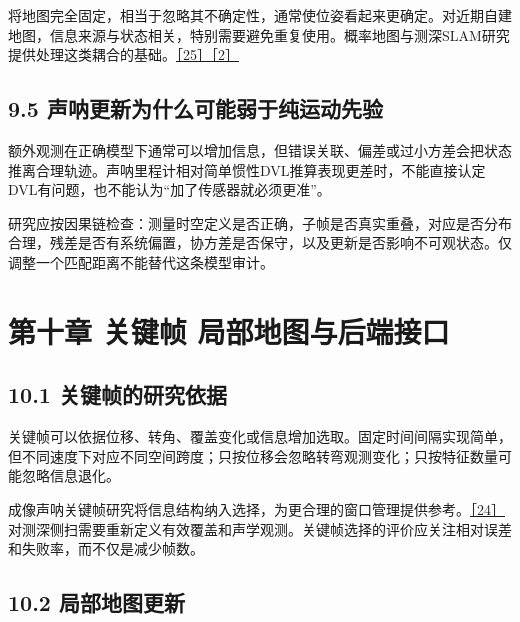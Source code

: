 将地图完全固定，相当于忽略其不确定性，通常使位姿看起来更确定。对近期自建地图，信息来源与状态相关，特别需要避免重复使用。概率地图与测深SLAM研究提供处理这类耦合的基础。\href{https://arxiv.org/abs/2203.10893}{［25］}\href{https://doi.org/10.1177/0278364912459666}{［2］}

\hypertarget{ux58f0ux5450ux66f4ux65b0ux4e3aux4ec0ux4e48ux53efux80fdux5f31ux4e8eux7eafux8fd0ux52a8ux5148ux9a8c}{%
\subsection{9.5 声呐更新为什么可能弱于纯运动先验}\label{ux58f0ux5450ux66f4ux65b0ux4e3aux4ec0ux4e48ux53efux80fdux5f31ux4e8eux7eafux8fd0ux52a8ux5148ux9a8c}}

额外观测在正确模型下通常可以增加信息，但错误关联、偏差或过小方差会把状态推离合理轨迹。声呐里程计相对简单惯性DVL推算表现更差时，不能直接认定DVL有问题，也不能认为``加了传感器就必须更准''。

研究应按因果链检查：测量时空定义是否正确，子帧是否真实重叠，对应是否分布合理，残差是否有系统偏置，协方差是否保守，以及更新是否影响不可观状态。仅调整一个匹配距离不能替代这条模型审计。

\hypertarget{ux7b2cux5341ux7ae0-ux5173ux952eux5e27-ux5c40ux90e8ux5730ux56feux4e0eux540eux7aefux63a5ux53e3}{%
\section{第十章 关键帧 局部地图与后端接口}\label{ux7b2cux5341ux7ae0-ux5173ux952eux5e27-ux5c40ux90e8ux5730ux56feux4e0eux540eux7aefux63a5ux53e3}}

\hypertarget{ux5173ux952eux5e27ux7684ux7814ux7a76ux4f9dux636e}{%
\subsection{10.1 关键帧的研究依据}\label{ux5173ux952eux5e27ux7684ux7814ux7a76ux4f9dux636e}}

关键帧可以依据位移、转角、覆盖变化或信息增加选取。固定时间间隔实现简单，但不同速度下对应不同空间跨度；只按位移会忽略转弯观测变化；只按特征数量可能忽略信息退化。

成像声呐关键帧研究将信息结构纳入选择，为更合理的窗口管理提供参考。\href{https://arxiv.org/abs/2106.16032}{［24］} 对测深侧扫需要重新定义有效覆盖和声学观测。关键帧选择的评价应关注相对误差和失败率，而不仅是减少帧数。

\hypertarget{ux5c40ux90e8ux5730ux56feux66f4ux65b0}{%
\subsection{10.2 局部地图更新}\label{ux5c40ux90e8ux5730ux56feux66f4ux65b0}}

